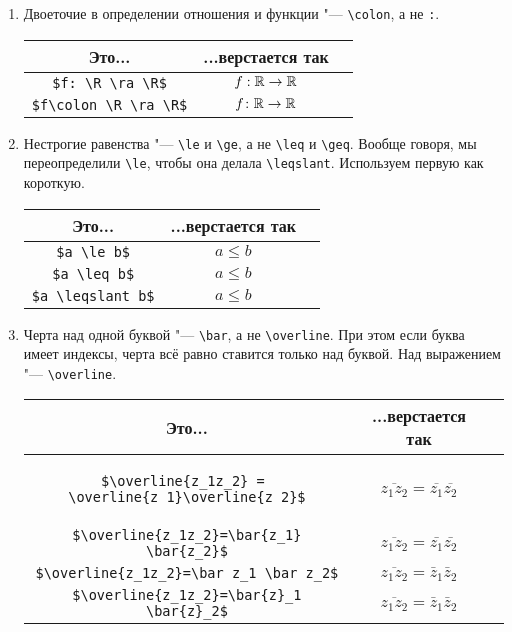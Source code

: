 \begin{enumerate}
\begin{enumerate}
	\item 
		Двоеточие в определении отношения и функции "--- \verb'\colon', а не \verb':'.
		\begin{center}\begin{tabular}{|c|c|c|}
			\hline Это... & ...верстается так & \\
			\hline \verb'$f: \R \ra \R$' & $f:\mathbb{R}\rightarrow\mathbb{R}$ \bad \\
			\hline \verb'$f\colon \R \ra \R$' & $f\colon\mathbb{R}\rightarrow\mathbb{R}$ \ok \\
			\hline
		\end{tabular}\end{center}

	\item
		Нестрогие равенства "--- \verb'\le' и \verb'\ge', а не \verb'\leq' и \verb'\geq'.
		Вообще говоря, мы переопределили \verb'\le', чтобы она делала \verb'\leqslant'.
		Используем первую как короткую.
		\begin{center}\begin{tabular}{|c|c|c|}
			\hline Это... & ...верстается так & \\
			\hline \verb'$a \le b$' & $a \le b$ \ok \\
			\hline \verb'$a \leq b$' & $a \leq b$ \bad \\
			\hline \verb'$a \leqslant b$' & $a \leqslant b$ \bad \\
			\hline
		\end{tabular}\end{center}
	
	\item 
		Черта над одной буквой "--- \verb'\bar', а не \verb'\overline'.
		При этом если буква имеет индексы, черта всё равно ставится только над буквой.
		Над выражением "--- \verb'\overline'.
		\begin{center}\begin{tabular}{|c|c|c|}
			\hline Это... & ...верстается так & \\
			\hline
			\begin{minipage}{10cm}
\begin{verbatim}
$\overline{z_1z_2} = 
\overline{z_1}\overline{z_2}$
\end{verbatim}
			\end{minipage}
			& $\overline{z_1z_2} = \overline{z_1}\overline{z_2}$ \bad \\
			\hline \verb'$\overline{z_1z_2}=\bar{z_1} \bar{z_2}$' & $\overline{z_1z_2} = \bar{z_1} \bar{z_2}$ \bad \\
			\hline \verb'$\overline{z_1z_2}=\bar z_1 \bar z_2$' & $\overline{z_1z_2} = \bar z_1 \bar z_2$ \ok \\
			\hline \verb'$\overline{z_1z_2}=\bar{z}_1 \bar{z}_2$' & $\overline{z_1z_2} = \bar z_1 \bar z_2$ \ok \\
			\hline
		\end{tabular}\end{center}


\end{enumerate}
\end{enumerate}
